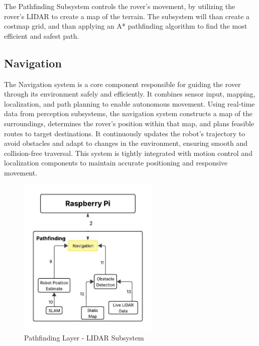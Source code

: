 


The Pathfinding Subsystem controls the rover's movement, by utilizing the rover's LIDAR to create a map of the terrain. The subsystem will than create a costmap grid, and than applying an A* pathfinding algorithm to find the most efficient and safest path.

\subsection{Navigation}
The Navigation system is a core component responsible for guiding the rover through its environment safely and efficiently. It combines sensor input, mapping, localization, and path planning to enable autonomous movement. Using real-time data from perception subsystems, the navigation system constructs a map of the surroundings, determines the rover's position within that map, and plans feasible routes to target destinations. It continuously updates the robot's trajectory to avoid obstacles and adapt to changes in the environment, ensuring smooth and collision-free traversal. This system is tightly integrated with motion control and localization components to maintain accurate positioning and responsive movement.

\begin{figure}[h!]
	\centering
 	\includegraphics[width=0.60\textwidth]{images/pathfinding2nd/Data_Flow_Navigation.jpeg}
 \caption{Pathfinding Layer - LIDAR Subsystem}
\end{figure}


